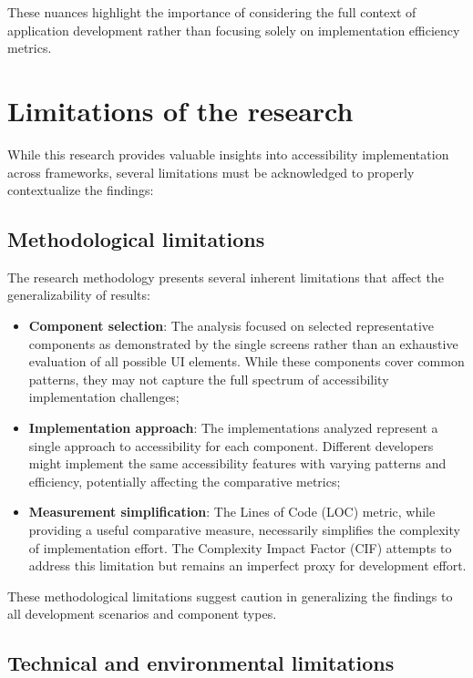 These nuances highlight the importance of considering the full context of application development rather than focusing solely on implementation efficiency metrics.

\section{Limitations of the research}
\label{sec:limitations}

While this research provides valuable insights into accessibility implementation across frameworks, several limitations must be acknowledged to properly contextualize the findings:

\subsection{Methodological limitations}
\label{subsec:limitations-methodology}

The research methodology presents several inherent limitations that affect the generalizability of results:

\begin{itemize}
    \item \textbf{Component selection}: The analysis focused on selected representative components as demonstrated by the single screens rather than an exhaustive evaluation of all possible UI elements. While these components cover common patterns, they may not capture the full spectrum of accessibility implementation challenges;

    \item \textbf{Implementation approach}: The implementations analyzed represent a single approach to accessibility for each component. Different developers might implement the same accessibility features with varying patterns and efficiency, potentially affecting the comparative metrics;

    \item \textbf{Measurement simplification}: The Lines of Code (LOC) metric, while providing a useful comparative measure, necessarily simplifies the complexity of implementation effort. The Complexity Impact Factor (CIF) attempts to address this limitation but remains an imperfect proxy for development effort.
\end{itemize}

These methodological limitations suggest caution in generalizing the findings to all development scenarios and component types.

\subsection{Technical and environmental limitations}
\label{subsec:limitations-technical}

